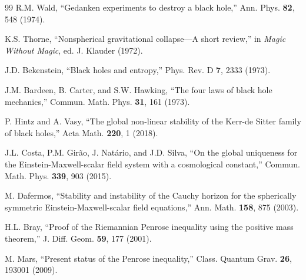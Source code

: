 \documentclass[12pt,a4paper]{article}
\begin{document}
\begin{thebibliography}{99}
R.M. Wald, ``Gedanken experiments to destroy a black hole,'' Ann. Phys. \textbf{82}, 548 (1974).

K.S. Thorne, ``Nonspherical gravitational collapse---A short review,'' in \textit{Magic Without Magic}, ed. J. Klauder (1972).

J.D. Bekenstein, ``Black holes and entropy,'' Phys. Rev. D \textbf{7}, 2333 (1973).

J.M. Bardeen, B. Carter, and S.W. Hawking, ``The four laws of black hole mechanics,'' Commun. Math. Phys. \textbf{31}, 161 (1973).

P. Hintz and A. Vasy, ``The global non-linear stability of the Kerr-de Sitter family of black holes,'' Acta Math. \textbf{220}, 1 (2018).

J.L. Costa, P.M. Girão, J. Natário, and J.D. Silva, ``On the global uniqueness for the Einstein-Maxwell-scalar field system with a cosmological constant,'' Commun. Math. Phys. \textbf{339}, 903 (2015).

M. Dafermos, ``Stability and instability of the Cauchy horizon for the spherically symmetric Einstein-Maxwell-scalar field equations,'' Ann. Math. \textbf{158}, 875 (2003).

H.L. Bray, ``Proof of the Riemannian Penrose inequality using the positive mass theorem,'' J. Diff. Geom. \textbf{59}, 177 (2001).

M. Mars, ``Present status of the Penrose inequality,'' Class. Quantum Grav. \textbf{26}, 193001 (2009).

\end{thebibliography}
\end{document}
